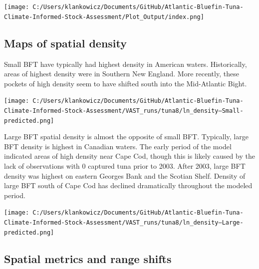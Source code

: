 \documentclass[
]{article}
\let\origfigure\figure
\let\endorigfigure\endfigure
\renewenvironment{figure}[1][2] {
    \expandafter\origfigure\expandafter[H]
} {
    \endorigfigure
}
\begin{document}
\begin{figure}
\centering
\texttt{[image: C:/Users/klankowicz/Documents/GitHub/Atlantic-Bluefin-Tuna-Climate-Informed-Stock-Assessment/Plot\_Output/index.png]}
\caption{Fig. 4: Joint indices of abundance}
\end{figure}

\newpage

\hypertarget{maps-of-spatial-density}{%
\subsection{Maps of spatial density}\label{maps-of-spatial-density}}

Small BFT have typically had highest density in American waters. Historically, areas of highest density were in Southern New England. More recently, these pockets of high density seem to have shifted south into the Mid-Atlantic Bight.

\begin{figure}
\centering
\texttt{[image: C:/Users/klankowicz/Documents/GitHub/Atlantic-Bluefin-Tuna-Climate-Informed-Stock-Assessment/VAST\_runs/tuna8/ln\_density--Small-predicted.png]}
\caption{Fig. 5:Small BFT spatio-temporal density}
\end{figure}

\newpage

Large BFT spatial density is almost the opposite of small BFT. Typically, large BFT density is highest in Canadian waters. The early period of the model indicated areas of high density near Cape Cod, though this is likely caused by the lack of observations with 0 captured tuna prior to 2003. After 2003, large BFT density was highest on eastern Georges Bank and the Scotian Shelf. Density of large BFT south of Cape Cod has declined dramatically throughout the modeled period.

\begin{figure}
\centering
\texttt{[image: C:/Users/klankowicz/Documents/GitHub/Atlantic-Bluefin-Tuna-Climate-Informed-Stock-Assessment/VAST\_runs/tuna8/ln\_density--Large-predicted.png]}
\caption{Fig. 6: Large BFT spatio-temporal density}
\end{figure}

\newpage

\hypertarget{spatial-metrics-and-range-shifts}{%
\subsection{Spatial metrics and range shifts}\label{spatial-metrics-and-range-shifts}}
\end{document}
